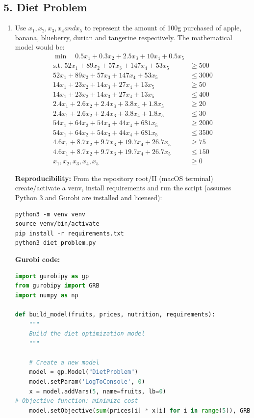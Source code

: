 \documentclass[12pt]{article}
\begin{document}
\subsection*{5. Diet Problem}
\begin{enumerate}[label= (\alph*), leftmargin=2em]
\item Use $x_1, x_2, x_3, x_4 and x_5$ to represent the amount of 100g purchased of apple, banana, blueberry, durian and tangerine respectively. The mathematical model would be:
\begin{align*}
\min \quad 0.5x_1 + 0.3x_2 + 2.5x_3 + 10x_4 +0.5x_5 \\
\text{s.t. } 52x_1 + 89x_2 + 57x_3 + 147x_4 + 53x_5 &\geq 500 \\
52x_1 + 89x_2 + 57x_3 + 147x_4 + 53x_5 &\leq 3000 \\
14x_1 + 23x_2 + 14x_3 + 27x_4 + 13x_5 &\geq 50 \\
14x_1 + 23x_2 + 14x_3 + 27x_4 + 13x_5 &\leq 400 \\
2.4x_1 + 2.6x_2 + 2.4x_3 + 3.8x_4 + 1.8x_5 &\geq 20 \\
2.4x_1 + 2.6x_2 + 2.4x_3 + 3.8x_4 + 1.8x_5 &\leq 30 \\
54x_1 + 64x_2 + 54x_3 + 44x_4 + 681x_5 &\geq 2000 \\
54x_1 + 64x_2 + 54x_3 + 44x_4 + 681x_5 &\leq 3500 \\
4.6x_1 + 8.7x_2 + 9.7x_3 + 19.7x_4 + 26.7x_5 &\geq 75 \\
4.6x_1 + 8.7x_2 + 9.7x_3 + 19.7x_4 + 26.7x_5 &\leq 150 \\
x_1, x_2, x_3, x_4, x_5 &\geq 0
\end{align*}

\textbf{Reproducibility:} From the repository root/II (macOS terminal) create/activate a venv, install requirements and run the script (assumes Python 3 and Gurobi are installed and licensed):
\begin{verbatim}
python3 -m venv venv
source venv/bin/activate
pip install -r requirements.txt
python3 diet_problem.py
\end{verbatim}

\textbf{Gurobi code:}
\begin{lstlisting}[language=Python, caption={Investment Optimization Python Code}]
import gurobipy as gp
from gurobipy import GRB
import numpy as np

def build_model(fruits, prices, nutrition, requirements):
    """
    Build the diet optimization model
    """

    # Create a new model
    model = gp.Model("DietProblem")
    model.setParam('LogToConsole', 0)
    x = model.addVars(5, name=fruits, lb=0)
# Objective function: minimize cost
    model.setObjective(sum(prices[i] * x[i] for i in range(5)), GRB.MINIMIZE)


\end{lstlisting}
\end{enumerate}
\end{document}
